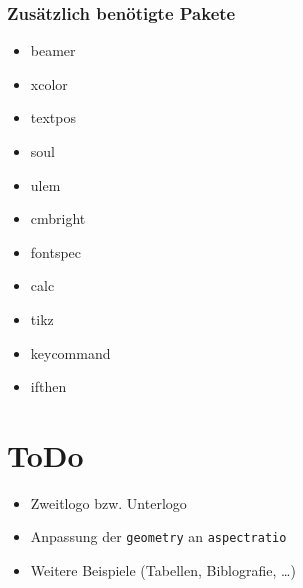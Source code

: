 \documentclass[rgb]{beamer}
\begin{document}
\begin{frame}[t]
	\frametitle{Zusätzlich benötigte Pakete}
	\begin{itemize}
	    \item beamer
	    \item xcolor
		\item textpos
		\item soul
		\item ulem
		\item cmbright
		\item fontspec
		\item calc
		\item tikz
		\item keycommand
		\item ifthen
	\end{itemize}
\end{frame}


\section{ToDo}

\begin{frame}[t]
	\sectionpage
	\begin{itemize}
		\item Zweitlogo bzw. Unterlogo
		\item Anpassung der \texttt{geometry} an \texttt{aspectratio}
		\item Weitere Beispiele (Tabellen, Biblografie, \ldots)
	\end{itemize}
\end{frame}
\end{document}
